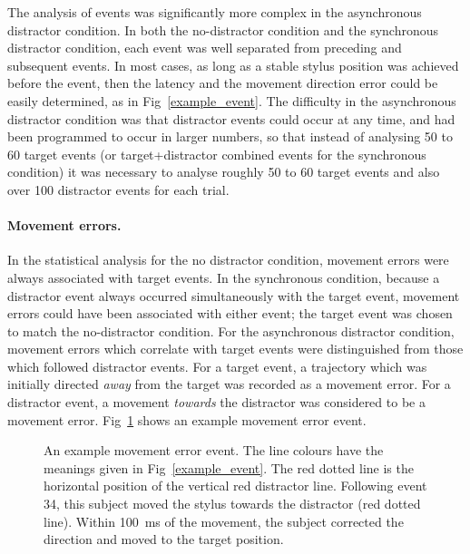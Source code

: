 \documentclass[10pt,letterpaper]{article}
\begin{document}
The analysis of events was significantly more complex in the
asynchronous distractor condition. In both the no-distractor condition
and the synchronous distractor condition, each event was well
separated from preceding and subsequent events. In most cases, as long
as a stable stylus position was achieved before the event, then the
latency and the movement direction error could be easily determined,
as in Fig~\ref{example_event}. The difficulty in the asynchronous
distractor condition was that distractor events could occur at any
time, and had been programmed to occur in larger numbers, so that
instead of analysing 50 to 60 target events (or target+distractor
combined events for the synchronous condition) it was necessary to
analyse roughly 50 to 60 target events and also over 100 distractor
events for each trial.

\paragraph{Movement errors.} In the statistical analysis for the no
distractor condition, movement errors were always associated with
target events. In the synchronous condition, because a distractor
event always occurred simultaneously with the target event, movement
errors could have been associated with either event; the target event
was chosen to match the no-distractor condition. For the
asynchronous distractor condition, movement errors which correlate
with target events were distinguished from those which followed
distractor events. For a target event, a trajectory which was initially
directed \emph{away} from the target was recorded as a movement error. For a
distractor event, a movement \emph{towards} the distractor was considered to
be a movement error. Fig~\ref{example_errorevent} shows an example movement
error event.

\begin{figure}[htb!]
\centering
\caption[Example error event] {An example movement error event. The
  line colours have the meanings given in
  Fig~\ref{example_event}. The red dotted line is the horizontal
  position of the vertical red distractor line. Following event 34,
  this subject moved the stylus towards the distractor (red dotted
  line). Within 100~ms of the movement, the subject corrected the
  direction and moved to the target position.}
\label{example_errorevent}
\end{figure}
\end{document}
